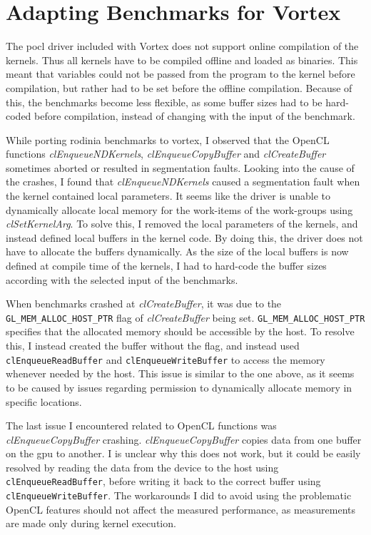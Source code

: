 
\section{Adapting Benchmarks for Vortex}

The \gls{pocl} driver included with Vortex does not support online compilation of the kernels. Thus all kernels have to be compiled offline and loaded as binaries. This meant that variables could not be passed from the program to the kernel before compilation, but rather had to be set before the offline compilation. Because of this, the benchmarks become less flexible, as some buffer sizes had to be hard-coded before compilation, instead of changing with the input of the benchmark.

While porting \Gls{rodinia} benchmarks to \Gls{vortex}, I observed that the OpenCL functions \textit{clEnqueueNDKernels}, \textit{clEnqueueCopyBuffer} and \textit{clCreateBuffer} sometimes aborted or resulted in segmentation faults. Looking into the cause of the crashes, I found that \textit{clEnqueueNDKernels} caused a segmentation fault when the kernel contained local parameters. It seems like the driver is unable to dynamically allocate local memory for the work-items of the work-groups using \textit{clSetKernelArg}. To solve this, I removed the local parameters of the kernels, and instead defined local buffers in the kernel code. By doing this, the driver does not have to allocate the buffers dynamically. As the size of the local buffers is now defined at compile time of the kernels, I had to hard-code the buffer sizes according with the selected input of the benchmarks.

When benchmarks crashed at \textit{clCreateBuffer}, it was due to the \texttt{GL\_MEM\_ALLOC\_HOST\_PTR} flag of \textit{clCreateBuffer} being set. \texttt{GL\_MEM\_ALLOC\_HOST\_PTR} specifies that the allocated memory should be accessible by the host. To resolve this, I instead created the buffer without the flag, and instead used \texttt{clEnqueueReadBuffer} and \texttt{clEnqueueWriteBuffer} to access the memory whenever needed by the host. This issue is similar to the one above, as it seems to be caused by issues regarding permission to dynamically allocate memory in specific locations.

The last issue I encountered related to OpenCL functions was \textit{clEnqueueCopyBuffer} crashing. \textit{clEnqueueCopyBuffer} copies data from one buffer on the \acrshort{gpu} to another. I is unclear why this does not work, but it could be easily resolved by reading the data from the device to the host using \texttt{clEnqueueReadBuffer}, before writing it back to the correct buffer using \texttt{clEnqueueWriteBuffer}. The workarounds I did to avoid using the problematic OpenCL features should not affect the measured performance, as measurements are made only during kernel execution.

